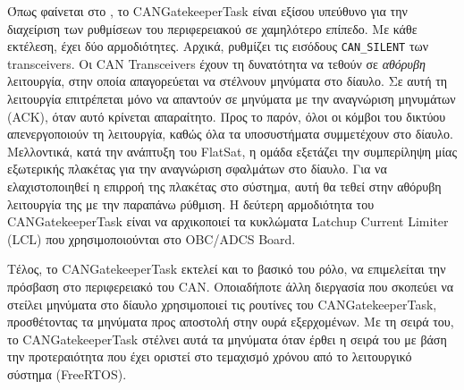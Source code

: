 \documentclass[a4paper,nobib,justified]{tufte-book}
\begin{document}
Όπως φαίνεται στο , το CANGatekeeperTask είναι εξίσου υπεύθυνο για την διαχείριση των ρυθμίσεων του περιφερειακού σε χαμηλότερο επίπεδο. Με κάθε εκτέλεση, έχει δύο αρμοδιότητες. Αρχικά, ρυθμίζει τις εισόδους \texttt{CAN\_SILENT} των transceivers.  Οι CAN Transceivers έχουν τη δυνατότητα να τεθούν σε \textit{αθόρυβη} λειτουργία, στην οποία απαγορεύεται να στέλνουν μηνύματα στο δίαυλο. Σε αυτή τη λειτουργία επιτρέπεται μόνο να απαντούν σε μηνύματα με την αναγνώριση μηνυμάτων (ACK), όταν αυτό κρίνεται απαραίτητο. Προς το παρόν, όλοι οι κόμβοι του δικτύου απενεργοποιούν τη λειτουργία, καθώς όλα τα υποσυστήματα συμμετέχουν στο δίαυλο. Μελλοντικά, κατά την ανάπτυξη του FlatSat, η ομάδα εξετάζει την συμπερίληψη μίας εξωτερικής πλακέτας για την αναγνώριση σφαλμάτων στο δίαυλο. Για να ελαχιστοποιηθεί η επιρροή της πλακέτας στο σύστημα, αυτή θα τεθεί στην αθόρυβη λειτουργία της με την παραπάνω ρύθμιση.  Η δεύτερη αρμοδιότητα του CANGatekeeperTask είναι να αρχικοποιεί τα κυκλώματα Latchup Current Limiter (LCL) που χρησιμοποιούνται στο OBC/ADCS Board. 

Τέλος, το CANGatekeeperTask εκτελεί και το βασικό του ρόλο, να επιμελείται την πρόσβαση στο περιφερειακό του CAN. Οποιαδήποτε άλλη διεργασία που σκοπεύει να στείλει μηνύματα στο δίαυλο χρησιμοποιεί τις ρουτίνες του CANGatekeeperTask, προσθέτοντας τα μηνύματα προς αποστολή στην ουρά εξερχομένων. Με τη σειρά του, το CANGatekeeperTask στέλνει αυτά τα μηνύματα όταν έρθει η σειρά του με βάση την προτεραιότητα που έχει οριστεί στο τεμαχισμό χρόνου από το λειτουργικό σύστημα (FreeRTOS).
\end{document}
